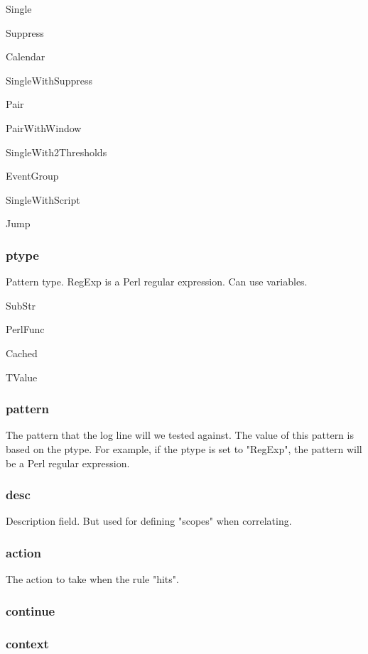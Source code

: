 Single

Suppress

Calendar

SingleWithSuppress

Pair

PairWithWindow

SingleWith2Thresholds

EventGroup

SingleWithScript

Jump

\subsubsection{ptype}
Pattern type. RegExp is a Perl regular expression. Can use variables.

SubStr

PerlFunc

Cached

TValue

\subsubsection{pattern}
The pattern that the log line will we tested against. The value of this pattern is based on the ptype. For example, if the ptype is set to "RegExp", the pattern will be a Perl regular expression.

\subsubsection{desc}
Description field. But used for defining "scopes" when correlating.

\subsubsection{action}
The action to take when the rule "hits".

\subsubsection{continue}

\subsubsection{context}
